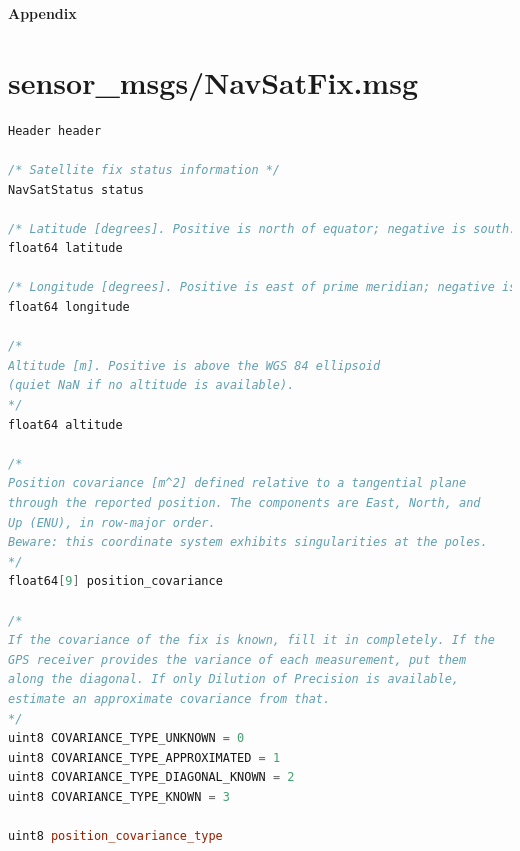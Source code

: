 \documentclass[titlepage,12pt,a4paper]{article}
\begin{document}
\pagebreak
{\huge \textbf{Appendix}}
\appendix
\addappheadtotoc
\section{sensor\_msgs/NavSatFix.msg}
\label{appendix:NavSatFix.msg}
\begin{lstlisting}[language=C++]
Header header

/* Satellite fix status information */
NavSatStatus status

/* Latitude [degrees]. Positive is north of equator; negative is south. */
float64 latitude

/* Longitude [degrees]. Positive is east of prime meridian; negative is west. */
float64 longitude

/*
Altitude [m]. Positive is above the WGS 84 ellipsoid
(quiet NaN if no altitude is available).
*/
float64 altitude

/*
Position covariance [m^2] defined relative to a tangential plane
through the reported position. The components are East, North, and
Up (ENU), in row-major order.
Beware: this coordinate system exhibits singularities at the poles.
*/
float64[9] position_covariance

/*
If the covariance of the fix is known, fill it in completely. If the
GPS receiver provides the variance of each measurement, put them
along the diagonal. If only Dilution of Precision is available,
estimate an approximate covariance from that.
*/
uint8 COVARIANCE_TYPE_UNKNOWN = 0
uint8 COVARIANCE_TYPE_APPROXIMATED = 1
uint8 COVARIANCE_TYPE_DIAGONAL_KNOWN = 2
uint8 COVARIANCE_TYPE_KNOWN = 3

uint8 position_covariance_type
\end{lstlisting}
\pagebreak
\end{document}
